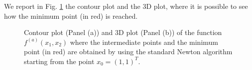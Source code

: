 \documentclass[a4paper,11pt]{article}
\begin{document}
	\noindent We report in Fig. \ref{Fig:func_a} the contour plot and the 3D plot, where it is possible to see how the minimum point (in red) is reached.
	\begin{figure}[H]
		\centering
		 \quad
		\caption{Contour plot (Panel (a)) and 3D plot (Panel (b)) of the function $f^{(a)}(x_{1},x_{2})$ where the intermediate points and the minimum point (in red) are obtained by using the standard Newton algorithm starting from the point $x_{0}=(1,1)^{T}$.}
		\label{Fig:func_a}
	\end{figure}
\end{document}
